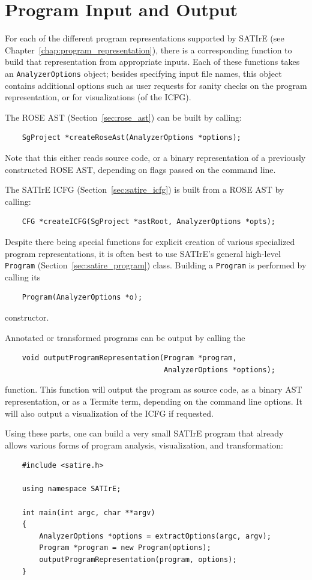 \documentclass[a4paper,12pt]{report}
\begin{document}
\section{Program Input and Output}
\label{sec:program_io}

For each of the different program representations supported by SATIrE
(see Chapter~\ref{chap:program_representation}), there is a corresponding
function to build that representation from appropriate inputs. Each of these
functions takes an \texttt{AnalyzerOptions} object; besides specifying input
file names, this object contains additional options such as user requests
for sanity checks on the program representation, or for visualizations (of
the ICFG).

The ROSE AST (Section~\ref{sec:rose_ast}) can be built by calling:
\begin{verbatim}
    SgProject *createRoseAst(AnalyzerOptions *options);
\end{verbatim}
Note that this either reads source code, or a binary representation of a
previously constructed ROSE AST, depending on flags passed on the command
line.

The SATIrE ICFG (Section~\ref{sec:satire_icfg}) is built from a
ROSE AST by calling:
\begin{verbatim}
    CFG *createICFG(SgProject *astRoot, AnalyzerOptions *opts);
\end{verbatim}

Despite there being special functions for explicit creation of various
specialized program representations, it is often best to use SATIrE's
general high-level \texttt{Program} (Section~\ref{sec:satire_program})
class. Building a \texttt{Program} is performed by calling its
\begin{verbatim}
    Program(AnalyzerOptions *o);
\end{verbatim}
constructor.

Annotated or transformed programs can be output by calling the
\begin{verbatim}
    void outputProgramRepresentation(Program *program,
                                     AnalyzerOptions *options);
\end{verbatim}
function. This function will output the program as source code, as a binary
AST representation, or as a Termite term, depending on the command line
options. It will also output a visualization of the ICFG if requested.

Using these parts, one can build a very small SATIrE program that already
allows various forms of program analysis, visualization, and transformation:
\begin{verbatim}
    #include <satire.h>

    using namespace SATIrE;

    int main(int argc, char **argv)
    {
        AnalyzerOptions *options = extractOptions(argc, argv);
        Program *program = new Program(options);
        outputProgramRepresentation(program, options);
    }
\end{verbatim}
\end{document}
